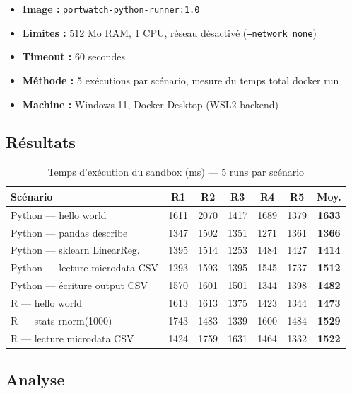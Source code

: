 \documentclass[12pt,a4paper]{article}
\begin{document}
\begin{itemize}
  \item \textbf{Image :} \texttt{portwatch-python-runner:1.0}
  \item \textbf{Limites :} 512 Mo RAM, 1 CPU, réseau désactivé (\texttt{--network none})
  \item \textbf{Timeout :} 60 secondes
  \item \textbf{Méthode :} 5 exécutions par scénario, mesure du temps total docker run
  \item \textbf{Machine :} Windows 11, Docker Desktop (WSL2 backend)
\end{itemize}

\subsection{Résultats}

\begin{table}[H]
\centering
\caption{Temps d'exécution du sandbox (ms) — 5 runs par scénario}
\begin{tabularx}{\textwidth}{|X|c|c|c|c|c|c|}
\hline
\textbf{Scénario} & \textbf{R1} & \textbf{R2} & \textbf{R3} & \textbf{R4} & \textbf{R5} & \textbf{Moy.} \\
\hline
Python — hello world           & 1611 & 2070 & 1417 & 1689 & 1379 & \textbf{1633} \\
Python — pandas describe       & 1347 & 1502 & 1351 & 1271 & 1361 & \textbf{1366} \\
Python — sklearn LinearReg.    & 1395 & 1514 & 1253 & 1484 & 1427 & \textbf{1414} \\
Python — lecture microdata CSV & 1293 & 1593 & 1395 & 1545 & 1737 & \textbf{1512} \\
Python — écriture output CSV   & 1570 & 1601 & 1501 & 1344 & 1398 & \textbf{1482} \\
\hline
R — hello world                & 1613 & 1613 & 1375 & 1423 & 1344 & \textbf{1473} \\
R — stats rnorm(1000)          & 1743 & 1483 & 1339 & 1600 & 1484 & \textbf{1529} \\
R — lecture microdata CSV      & 1424 & 1759 & 1631 & 1464 & 1332 & \textbf{1522} \\
\hline
\end{tabularx}
\end{table}

\subsection{Analyse}
\end{document}

